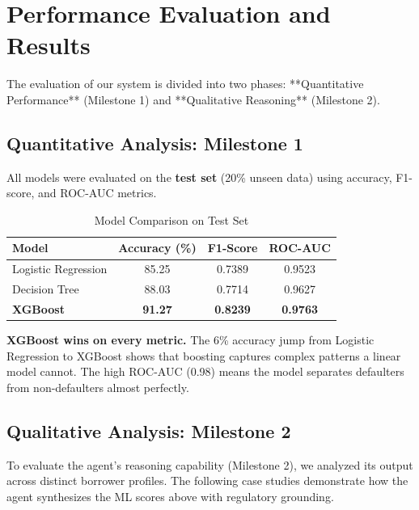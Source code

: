 \documentclass[12pt, a4paper]{article}
\begin{document}
\section{Performance Evaluation and Results}

The evaluation of our system is divided into two phases: **Quantitative Performance** (Milestone 1) and **Qualitative Reasoning** (Milestone 2).

\subsection{Quantitative Analysis: Milestone 1}

All models were evaluated on the \textbf{test set} (20\% unseen data) using accuracy, F1-score, and ROC-AUC metrics.

\begin{table}[H]
  \centering
  \caption{Model Comparison on Test Set}
  \label{tab:results}
  \renewcommand{\arraystretch}{1.5}
  \begin{tabular}{l c c c}
    \toprule
    \rowcolor{blue!20} \textbf{Model} & \textbf{Accuracy (\%)} & \textbf{F1-Score} & \textbf{ROC-AUC} \\
    \midrule
    Logistic Regression & 85.25 & 0.7389 & 0.9523 \\
    \rowcolor{gray!10} Decision Tree       & 88.03 & 0.7714 & 0.9627 \\
    \rowcolor{green!20} \textbf{XGBoost}    & \textbf{91.27} & \textbf{0.8239} & \textbf{0.9763} \\
    \bottomrule
  \end{tabular}
\end{table}

\textbf{XGBoost wins on every metric.} The 6\% accuracy jump from Logistic Regression to XGBoost shows that boosting captures complex patterns a linear model cannot. The high ROC-AUC (0.98) means the model separates defaulters from non-defaulters almost perfectly.

\subsection{Qualitative Analysis: Milestone 2}

To evaluate the agent's reasoning capability (Milestone 2), we analyzed its output across distinct borrower profiles. The following case studies demonstrate how the agent synthesizes the ML scores above with regulatory grounding.
\end{document}
